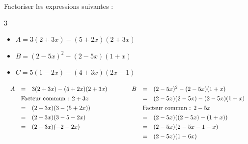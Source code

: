 \begin{methode}
	Factoriser les expressions suivantes :
	\begin{multicols}{3}
		\begin{itemize}
			\item $A = 3(2 + 3x) - (5 + 2x)(2 + 3x)$
			\item $B = (2 - 5x)^2 - (2 - 5x)(1 + x)$
			\item $C = 5(1 - 2x) - (4 + 3x)(2x - 1)$
		\end{itemize}
	\end{multicols}

	\begin{correction}
		\[
			\begin{array}{ll}%
				\def\arraystretch{1.3}%
				\begin{array}{rcl}%
					A & =                                                 & 3(2 + 3x) - (5 + 2x)(2 + 3x) \\
					  & \multicolumn{2}{l}{\text{Facteur commun : } 2+3x}                                \\
					  & =                                                 & (2 + 3x)(3 - (5 + 2x))       \\
					  & =                                                 & (2 + 3x)(3 - 5 - 2x)         \\
					  & =                                                 & (2 + 3x)(-2 - 2x)            \\
					  &                                                   &                              \\
				\end{array} \quad & \quad %
				\def\arraystretch{1.3}%
				\begin{array}{rcl}%
					B & =                                                 & (2 - 5x)^2 - (2 - 5x)(1 + x)       \\
					  & =                                                 & (2 - 5x)(2 - 5x) - (2 - 5x)(1 + x) \\
					  & \multicolumn{2}{l}{\text{Facteur commun : } 2-5x}                                      \\
					  & =                                                 & (2 - 5x)((2 - 5x) - (1 + x))       \\
					  & =                                                 & (2 - 5x)(2 - 5x - 1 - x)           \\
					  & =                                                 & (2 - 5x)(1 - 6x)                   \\

\end{array}
\end{array}\]
\end{correction}
\end{methode}
